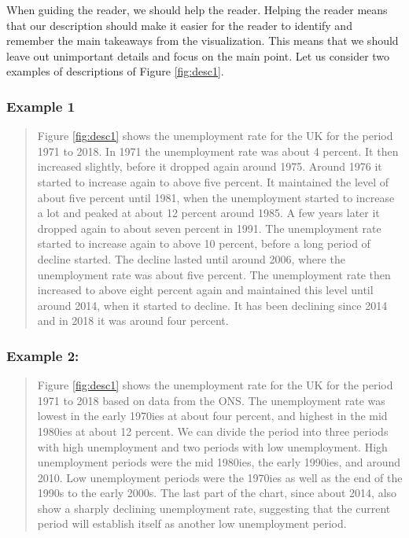 \documentclass[
]{book}
\begin{document}
When guiding the reader, we should help the reader. Helping the reader means that our description should make it easier for the reader to identify and remember the main takeaways from the visualization. This means that we should leave out unimportant details and focus on the main point. Let us consider two examples of descriptions of Figure \ref{fig:desc1}.

\hypertarget{example-1}{%
\subsubsection*{Example 1}\label{example-1}}

\begin{quote}
Figure \ref{fig:desc1} shows the unemployment rate for the UK for the period 1971 to 2018. In 1971 the unemployment rate was about 4 percent. It then increased slightly, before it dropped again around 1975. Around 1976 it started to increase again to above five percent. It maintained the level of about five percent until 1981, when the unemployment started to increase a lot and peaked at about 12 percent around 1985. A few years later it dropped again to about seven percent in 1991. The unemployment rate started to increase again to above 10 percent, before a long period of decline started. The decline lasted until around 2006, where the unemployment rate was about five percent. The unemployment rate then increased to above eight percent again and maintained this level until around 2014, when it started to decline. It has been declining since 2014 and in 2018 it was around four percent.
\end{quote}

\hypertarget{example-2}{%
\subsubsection*{Example 2:}\label{example-2}}

\begin{quote}
Figure \ref{fig:desc1} shows the unemployment rate for the UK for the period 1971 to 2018 based on data from the ONS. The unemployment rate was lowest in the early 1970ies at about four percent, and highest in the mid 1980ies at about 12 percent. We can divide the period into three periods with high unemployment and two periods with low unemployment. High unemployment periods were the mid 1980ies, the early 1990ies, and around 2010. Low unemployment periods were the 1970ies as well as the end of the 1990s to the early 2000s. The last part of the chart, since about 2014, also show a sharply declining unemployment rate, suggesting that the current period will establish itself as another low unemployment period.
\end{quote}
\end{document}
